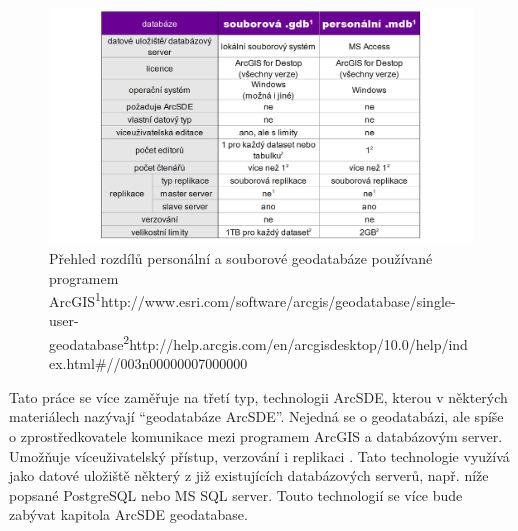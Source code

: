           \begin{figure}[H]
            \centering
            \includegraphics[width=1\textwidth]{../../../grafy/obr/tabulka_filePersonalDB_primo.png}
            \caption[Přehled rozdílů personální a souborové geodatabáze v ArcGIS]{Přehled rozdílů personální a souborové geodatabáze používané programem ArcGIS\newline\newline\textsuperscript{1}\small{http://www.esri.com/software/arcgis/geodatabase/single-user-geodatabase}\newline\textsuperscript{2}\small{http://help.arcgis.com/en/arcgisdesktop/10.0/help/index.html\#//003n00000007000000}
      }
          \end{figure}

        Tato práce se více zaměřuje na třetí typ, technologii ArcSDE, kterou v
        některých materiálech nazývají “geodatabáze ArcSDE”. Nejedná se o
        geodatabázi, ale spíše o zprostředkovatele komunikace mezi programem
        ArcGIS a databázovým server. Umožňuje víceuživatelský přístup,
        verzování i replikaci \citep{Esri2006}. Tato technologie využívá jako
        datové uložiště některý z již existujících databázových serverů, např.
        níže popsané PostgreSQL nebo MS SQL server. Touto technologií se více
        bude zabývat kapitola  ArcSDE geodatabase.
